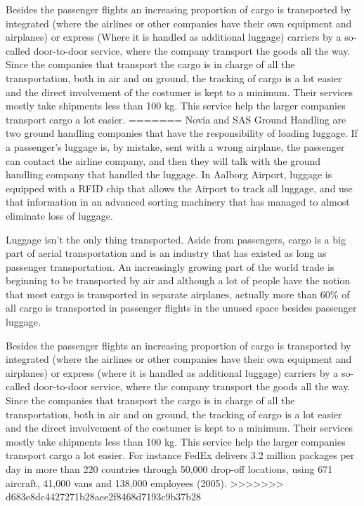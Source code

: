 Besides the passenger flights an increasing proportion of cargo is transported by integrated (where the airlines or other companies have their own equipment and airplanes) or express (Where it is handled as additional luggage) 
carriers by a so-called door-to-door service, where the company transport the goods all the way. Since the companies that transport the cargo is in charge of all the transportation, both in air and on ground, the tracking of cargo is a lot easier and the direct involvement of the costumer is kept to a minimum. Their services mostly take shipments less than 100 kg. This service help the larger companies transport cargo a lot easier.
=======
Novia and SAS Ground Handling are two ground handling companies that have the responsibility of loading luggage\cite{mistet_bagage}. If a passenger's luggage is, by mistake, sent with a wrong airplane, the passenger can contact the airline company, and then they will talk with the ground handling company that handled the luggage. In Aalborg Airport, luggage is equipped with a RFID chip that allows the Airport to track all luggage, and use that information in an advanced sorting machinery that has managed to almost eliminate loss of luggage.


Luggage isn't the only thing transported. Aside from passengers, cargo is a big part of aerial transportation and is an industry that has existed as long as passenger transportation. An increasingly growing part of the world trade is beginning to be transported by air and although a lot of people have the notion that most cargo is transported in separate airplanes, actually more than 60\% of all cargo is transported in passenger flights in the unused space besides passenger luggage.


Besides the passenger flights an increasing proportion of cargo is transported by integrated (where the airlines or other companies have their own equipment and airplanes) or express (where it is handled as additional luggage) carriers by a so-called door-to-door service, where the company transport the goods all the way. Since the companies that transport the cargo is in charge of all the transportation, both in air and on ground, the tracking of cargo is a lot easier and the direct involvement of the costumer is kept to a minimum. Their services mostly take shipments less than 100 kg. This service help the larger companies transport cargo a lot easier. For instance FedEx delivers 3.2 million packages per day in more than 220 countries through 50,000 drop-off locations, using 671 aircraft, 41,000 vans and 138,000 employees (2005).
>>>>>>> d683e8dc4427271b28aee2f8468d7193c9b37b28

